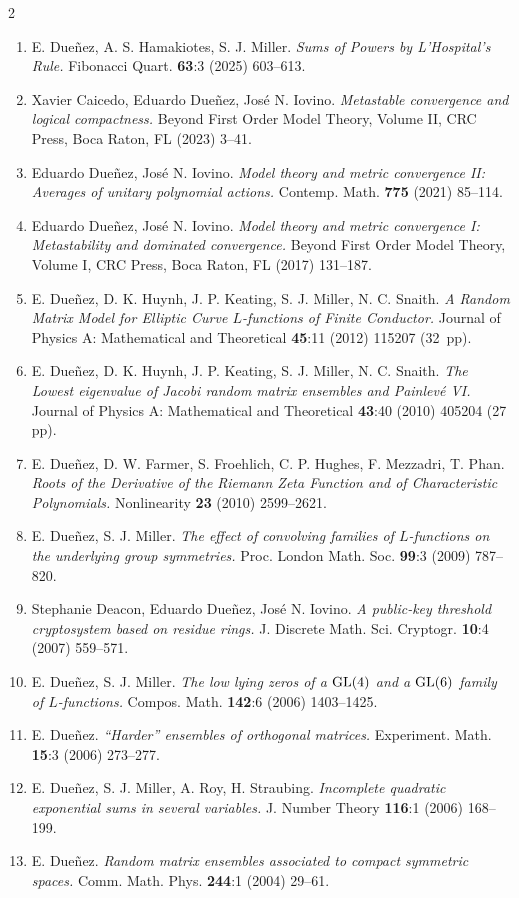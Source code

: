 \documentclass[10pt,a4paper,withhyper]{altacv}
\begin{document}
\begin{paracol}{2}
\begin{enumerate}
\item E. Due{\~n}ez, A. S. Hamakiotes, S. J. Miller. \emph{Sums of Powers by {L}'{H}ospital's Rule.} Fibonacci Quart. \textbf{63}:3 (2025) 603--613.
\item Xavier Caicedo, Eduardo Due\~{n}ez, Jos{\'e} N. Iovino. \emph{Metastable convergence and logical compactness.} Beyond First Order Model Theory, Volume II, CRC Press, Boca Raton, FL (2023) 3--41.
\item Eduardo Due\~{n}ez, Jos\'{e} N. Iovino. \emph{Model theory and metric convergence {II}: {A}verages of unitary polynomial actions.} Contemp. Math. \textbf{775} (2021) 85--114.
\item Eduardo Due\~{n}ez, Jos\'{e} N. Iovino. \emph{Model theory and metric convergence {I}: {M}etastability and dominated convergence.} Beyond First Order Model Theory, Volume I, CRC Press, Boca Raton, FL (2017) 131--187.
\item E. Due{\~n}ez, D. K. Huynh, J. P. Keating, S. J. Miller, N. C. Snaith. \emph{A Random Matrix Model for Elliptic Curve {$L$}-functions of Finite Conductor.} Journal of Physics A: Mathematical and Theoretical \textbf{45}:11 (2012) 115207 (32~pp).
\item E. Due{\~n}ez, D. K. Huynh, J. P. Keating, S. J. Miller, N. C. Snaith. \emph{The Lowest eigenvalue of {J}acobi random matrix ensembles and {P}ainlev{\'e} {VI}.} Journal of Physics A: Mathematical and Theoretical \textbf{43}:40 (2010) 405204 (27 pp).
\item E. Due{\~n}ez, D. W. Farmer, S. Froehlich, C. P. Hughes, F. Mezzadri, T. Phan. \emph{Roots of the Derivative of the {R}iemann Zeta Function and of Characteristic Polynomials.} Nonlinearity \textbf{23} (2010) 2599--2621.
\item E. Due{\~n}ez, S. J. Miller. \emph{The effect of convolving families of {$L$}-functions on the underlying group symmetries.} Proc. London Math. Soc. \textbf{99}:3 (2009) 787--820.
\item Stephanie Deacon, Eduardo Due{\~n}ez, Jos{\'e} N. Iovino. \emph{A public-key threshold cryptosystem based on residue rings.} J. Discrete Math. Sci. Cryptogr. \textbf{10}:4 (2007) 559--571.
\item E. Due{\~n}ez, S. J. Miller. \emph{The low lying zeros of a {$\rm GL(4)$} and a {$\rm GL(6)$} family of {$L$}-functions.} Compos. Math. \textbf{142}:6 (2006) 1403--1425.
\item E. Due{\~n}ez. \emph{``{H}arder'' ensembles of orthogonal matrices.} Experiment. Math. \textbf{15}:3 (2006) 273--277.
\item E. Due{\~n}ez, S. J. Miller, A. Roy, H. Straubing. \emph{Incomplete quadratic exponential sums in several variables.} J. Number Theory \textbf{116}:1 (2006) 168--199.
\item E. Due{\~n}ez. \emph{Random matrix ensembles associated to compact symmetric spaces.} Comm. Math. Phys. \textbf{244}:1 (2004) 29--61.
\end{enumerate}


\end{paracol}
\end{document}
